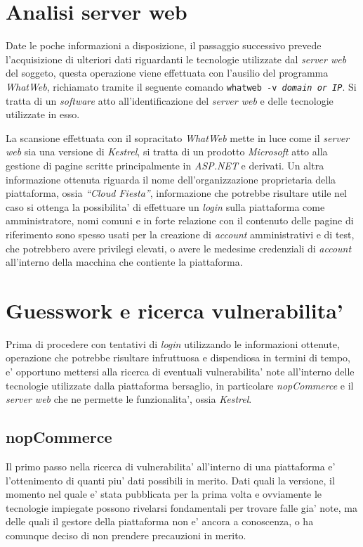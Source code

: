 \documentclass[a4paper]{report}
\newcommand{\quotes}[1]{``#1''}
\begin{document}
		\section{Analisi server web}\label{analisi_server_web}
			Date le poche informazioni a disposizione, il passaggio successivo prevede l'acquisizione di ulteriori dati
			riguardanti le tecnologie utilizzate dal \emph{server web} del soggeto, questa operazione viene effettuata
			con l'ausilio del programma \emph{WhatWeb}\label{whatweb}, richiamato tramite il seguente comando
			\texttt{whatweb -v \emph{domain or IP}}. Si tratta di un \emph{software} atto all'identificazione del
			\emph{server web} e delle tecnologie utilizzate in esso.

			La scansione effettuata con il sopracitato \emph{WhatWeb} mette in luce come il \emph{server web} sia una
			versione di \emph{Kestrel}, si tratta di un prodotto \emph{Microsoft} atto alla gestione di pagine scritte
			principalmente in \emph{ASP.NET} e derivati. Un altra informazione ottenuta riguarda il nome
			dell'organizzazione proprietaria della piattaforma, ossia \emph{\quotes{Cloud Fiesta}}, informazione che
			potrebbe risultare utile nel caso si ottenga la possibilita' di effettuare un \emph{login} sulla piattaforma
			come amministratore, nomi comuni e in forte relazione con il contenuto delle pagine di riferimento sono
			spesso usati per la creazione di \emph{account} amministrativi e di test, che potrebbero avere privilegi
			elevati, o avere le medesime credenziali di \emph{account} all'interno della macchina che contiente la
			piattaforma.
		\section{Guesswork e ricerca vulnerabilita'}\label{guesswork_e_ricerca_vulnerabilita}
			Prima di procedere con tentativi di \emph{login} utilizzando le informazioni ottenute, operazione che
			potrebbe risultare infruttuosa e dispendiosa in termini di tempo, e' opportuno mettersi alla ricerca di
			eventuali vulnerabilita' note all'interno delle tecnologie utilizzate dalla piattaforma bersaglio, in
			particolare \emph{nopCommerce} e il \emph{server web} che ne permette le funzionalita', ossia
			\emph{Kestrel}. 
			\subsection{nopCommerce}\label{nopcomerce_2}
				Il primo passo nella ricerca di vulnerabilita' all'interno di una piattaforma e' l'ottenimento di quanti
				piu' dati possibili in merito. Dati quali la versione, il momento nel quale e' stata pubblicata per la
				prima volta e ovviamente le tecnologie impiegate possono rivelarsi fondamentali per trovare falle gia'
				note, ma delle quali il gestore della piattaforma non e' ancora a conoscenza, o ha comunque deciso di
				non prendere precauzioni in merito.
\end{document}
